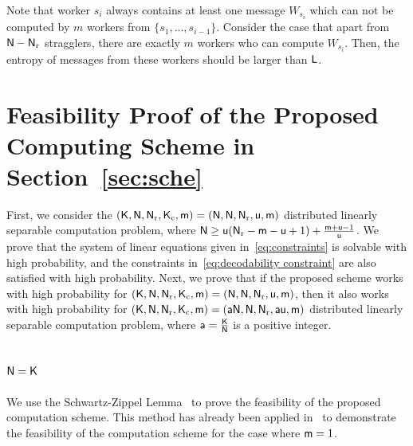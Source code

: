 \documentclass[conference,letterpaper]{IEEEtran}
\begin{document}
Note that worker $s_i$ always contains at least one message $W_{s_i}$ which can not be computed by $m$ workers from $\{s_1, \ldots, s_{i-1}\}$. Consider the case that apart from ${\sf N} - {\sf N}_{\rm r}$ stragglers, there are exactly $m$ workers who can compute $W_{s_i}$. Then,  the entropy of messages from these workers should be larger than ${\sf L}$.  



\section{Feasibility Proof   of  the Proposed Computing Scheme in Section~\ref{sec:sche}}
\label{sec:feasibility proof}
First, we consider the $({\sf K}, {\sf N}, {\sf N}_{\rm r}, {\sf K}_{\rm c}, {\sf m}) = ({\sf N}, {\sf N}, {\sf N}_{\rm r}, {\sf u}, {\sf m})$ distributed linearly separable computation problem, where ${\sf N} \geq {\sf u}({\sf N}_{\rm r}-{\sf m}-{\sf u}+1) + \frac{{\sf m}+{\sf u}-1}{{\sf u}} $. We prove that the system of linear equations given in~\eqref{eq:constraints} is solvable with high probability, and the constraints in~\eqref{eq:decodability constraint} are also satisfied with high probability.
Next, we prove that if the proposed scheme works with high probability for $({\sf K}, {\sf N}, {\sf N}_{\rm r}, {\sf K}_{\rm c}, {\sf m}) = ({\sf N}, {\sf N}, {\sf N}_{\rm r}, {\sf u}, {\sf m})$, then it also works with high probability for $({\sf K}, {\sf N}, {\sf N}_{\rm r}, {\sf K}_{\rm c}, {\sf m}) = ({\sf a}{\sf N}, {\sf N}, {\sf N}_{\rm r}, {\sf a}{\sf u}, {\sf m})$ distributed linearly separable computation problem, where ${\sf a} = \frac{{\sf K}}{{\sf N}}$ is a positive integer.
\subsection{\texorpdfstring{${\sf N} = {\sf K}$}{Nsf = Ksf}}
   \label{sub:proof K=N}
We use the Schwartz-Zippel Lemma~\cite{lemma1,lemma2,lemma3} to prove the feasibility of the proposed computation scheme. This method has already been applied in~\cite[Appendix C]{m=1} to demonstrate the feasibility of the computation scheme for the case where \({\sf m} = 1\).
\end{document}

